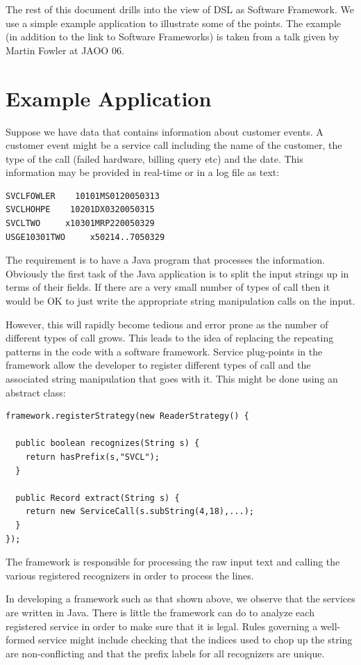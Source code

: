 The rest of this document drills into the view of DSL as Software Framework. 
We use a simple example application to illustrate some of the points. The 
example (in addition to the link to Software Frameworks) is taken from a talk 
given by Martin Fowler at JAOO 06.

\section{Example Application}

Suppose we have data that contains information about customer events. 
A customer event might be a service call including the name of the customer, 
the type of the call (failed hardware, billing query etc) and the date. This 
information may be provided in real-time or in a log file as text:
\begin{lstlisting}
SVCLFOWLER    10101MS0120050313
SVCLHOHPE    10201DX0320050315
SVCLTWO     x10301MRP220050329
USGE10301TWO     x50214..7050329
\end{lstlisting}
The requirement is to have a Java program that processes the information. 
Obviously the first task of the Java application is to split the input 
strings up in terms of their fields. If there are a very small number of 
types of call then it would be OK to just write the appropriate string 
manipulation calls on the input.

However, this will rapidly become tedious and error prone as the number 
of different types of call grows. This leads to the idea of replacing 
the repeating patterns in the code with a software framework. Service 
plug-points in the framework allow the developer to register different 
types of call and the associated string manipulation that goes with it. 
This might be done using an abstract class:
\begin{lstlisting}
framework.registerStrategy(new ReaderStrategy() {
  
  public boolean recognizes(String s) {
    return hasPrefix(s,"SVCL");
  }

  public Record extract(String s) {
    return new ServiceCall(s.subString(4,18),...);
  }
});
\end{lstlisting}
The framework is responsible for processing the raw input text and calling 
the various registered recognizers in order to process the lines.

In developing a framework such as that shown above, we observe that the 
services are written in Java. There is little the framework can do to 
analyze each registered service in order to make sure that it is legal. 
Rules governing a well-formed service might include checking that the 
indices used to chop up the string are non-conflicting and that the prefix 
labels for all recognizers are unique.

